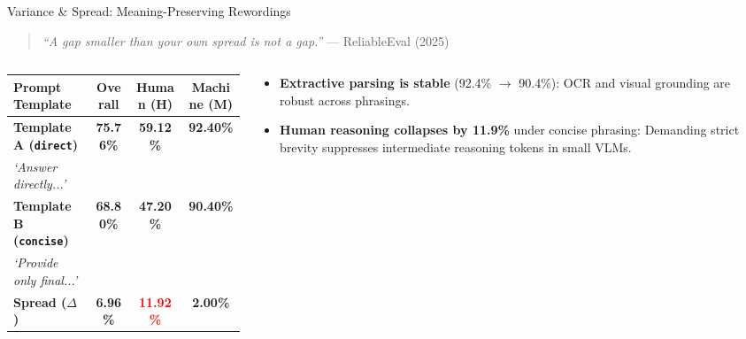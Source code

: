 \documentclass[aspectratio=169, 10pt]{beamer}
\begin{document}
\begin{frame}{Variance \& Spread: Meaning-Preserving Rewordings}
    \begin{quote}
        \small
        \textit{``A gap smaller than your own spread is not a gap.''} --- ReliableEval (2025)
    \end{quote}

    \begin{columns}[T]
        \begin{column}{0.50\textwidth}
            \begin{table}
                \centering
                \footnotesize
                \begin{tabular}{@{}lccc@{}}
                    \toprule
                    \textbf{Prompt Template} & \textbf{Overall} & \textbf{Human (H)} & \textbf{Machine (M)} \\
                    \midrule
                    \textbf{Template A (\texttt{direct})} & \textbf{75.76\%} & \textbf{59.12\%} & \textbf{92.40\%} \\
                    \textit{`Answer directly...'} & & & \\
                    \addlinespace[0.1cm]
                    \textbf{Template B (\texttt{concise})} & \textbf{68.80\%} & \textbf{47.20\%} & \textbf{90.40\%} \\
                    \textit{`Provide only final...'} & & & \\
                    \midrule
                    \textbf{Spread ($\Delta$)} & \textbf{6.96\%} & \textbf{\textcolor{red}{11.92\%}} & \textbf{\textcolor{success}{2.00\%}} \\
                    \bottomrule
                \end{tabular}
            \end{table}
        \end{column}

        \begin{column}{0.46\textwidth}
            \begin{tcolorbox}[colframe=accent, title=\textbf{Key Empirical Takeaway}]
                \small
                \begin{itemize}
                    \item \textbf{Extractive parsing is stable} (92.4\% $\to$ 90.4\%): OCR and visual grounding are robust across phrasings.
                    \item \textbf{Human reasoning collapses by 11.9\%} under concise phrasing: Demanding strict brevity suppresses intermediate reasoning tokens in small VLMs.
                \end{itemize}
            \end{tcolorbox}
        \end{column}
    \end{columns}
\end{frame}
\end{document}
